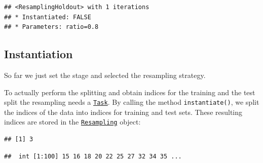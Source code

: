 \documentclass[]{scrbook}
\newenvironment{Shaded}{\begin{snugshade}}{\end{snugshade}}
\newcommand{\DataTypeTok}[1]{\textcolor[rgb]{0.13,0.29,0.53}{#1}}
\newcommand{\DecValTok}[1]{\textcolor[rgb]{0.00,0.00,0.81}{#1}}
\newcommand{\KeywordTok}[1]{\textcolor[rgb]{0.13,0.29,0.53}{\textbf{#1}}}
\newcommand{\NormalTok}[1]{#1}
\newcommand{\OperatorTok}[1]{\textcolor[rgb]{0.81,0.36,0.00}{\textbf{#1}}}
\newcommand{\StringTok}[1]{\textcolor[rgb]{0.31,0.60,0.02}{#1}}
\renewenvironment{Shaded} {\begin{snugshade}\small} {\end{snugshade}}
\begin{document}
\begin{verbatim}
## <ResamplingHoldout> with 1 iterations
## * Instantiated: FALSE
## * Parameters: ratio=0.8
\end{verbatim}

\hypertarget{resampling-inst}{%
\subsection{Instantiation}\label{resampling-inst}}

So far we just set the stage and selected the resampling strategy.

To actually perform the splitting and obtain indices for the training and the test split the resampling needs a \href{https://mlr3.mlr-org.com/reference/Task.html}{\texttt{Task}}.
By calling the method \texttt{instantiate()}, we split the indices of the data into indices for training and test sets.
These resulting indices are stored in the \href{https://mlr3.mlr-org.com/reference/Resampling.html}{\texttt{Resampling}} object:

\begin{Shaded}
\end{Shaded}

\begin{verbatim}
## [1] 3
\end{verbatim}

\begin{Shaded}
\end{Shaded}

\begin{verbatim}
##  int [1:100] 15 16 18 20 22 25 27 32 34 35 ...
\end{verbatim}

\begin{Shaded}
\end{Shaded}
\end{document}
